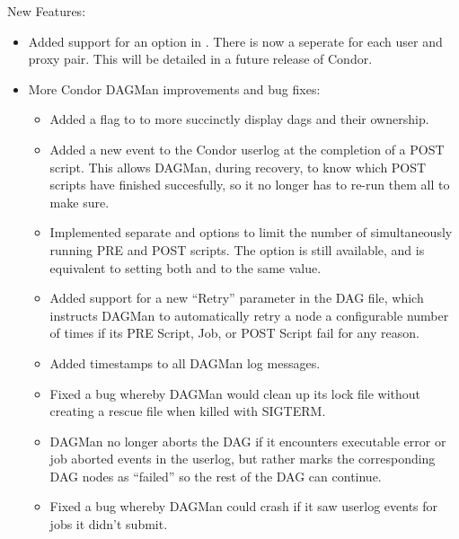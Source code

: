 \noindent New Features:
\begin{itemize}

\item
Added support for an  option in
. There is now a seperate  for each
user and proxy pair. This will be detailed in a future release of
Condor.
 
\item
More Condor DAGMan improvements and bug fixes:

\begin{itemize}

\item 
Added a  flag to  to more succinctly display dags
and their ownership.

\item
Added a new event to the Condor userlog at the completion of a POST
script.  This allows DAGMan, during recovery, to know which POST
scripts have finished succesfully, so it no longer has to re-run them
all to make sure.

\item
Implemented separate  and  options to limit
the number of simultaneously running PRE and POST scripts.  The
 option is still available, and is equivalent to
setting both  and  to the same value.

\item
Added support for a new ``Retry'' parameter in the DAG file, which
instructs DAGMan to automatically retry a node a configurable number
of times if its PRE Script, Job, or POST Script fail for any reason.

\item
Added timestamps to all DAGMan log messages.

\item
Fixed a bug whereby DAGMan would clean up its lock file without
creating a rescue file when killed with SIGTERM.

\item
DAGMan no longer aborts the DAG if it encounters executable error or
job aborted events in the userlog, but rather marks the corresponding
DAG nodes as ``failed'' so the rest of the DAG can continue.

\item
Fixed a bug whereby DAGMan could crash if it saw userlog events for
jobs it didn't submit.

\end{itemize}


\end{itemize}
